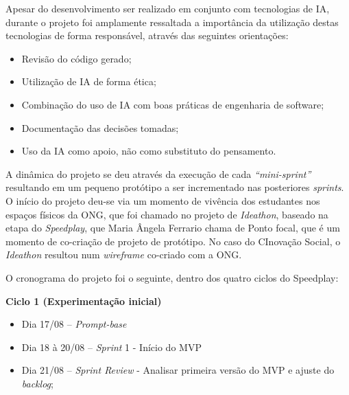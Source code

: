 Apesar do desenvolvimento ser realizado em conjunto com tecnologias de \gls{IA}, durante o projeto foi amplamente ressaltada a importância da utilização destas tecnologias de forma responsável, através das seguintes orientações:
\begin{itemize}
    \item Revisão do código gerado;
    \item Utilização de \gls{IA} de forma ética;
    \item Combinação do uso de \gls{IA} com boas práticas de engenharia de software;
    \item Documentação das decisões tomadas;
    \item Uso da \gls{IA} como apoio, não como substituto do pensamento.
\end{itemize}

A dinâmica do projeto se deu através da execução de cada \textit{“mini-sprint”} resultando em um pequeno protótipo a ser incrementado nas posteriores \textit{sprints}. O início do projeto deu-se via um momento de vivência dos estudantes nos espaços físicos da \gls{ONG}, que foi chamado no projeto de \textit{Ideathon}, baseado na etapa do \textit{Speedplay}, que Maria Ângela Ferrario chama de Ponto focal, que é um momento de co-criação de projeto de protótipo. No caso do CInovação Social, o \textit{Ideathon} resultou num \textit{wireframe} co-criado com a \gls{ONG}.






O cronograma do projeto foi o seguinte, dentro dos quatro ciclos do Speedplay:
\par\vspace{1\baselineskip}

\textbf{Ciclo 1 (Experimentação inicial)}
    \begin{itemize}
        \item Dia 17/08 –\textit{ Prompt-base}
        \item Dia 18 à 20/08 – \textit{Sprint} 1 - Início do \gls{MVP}
        \item Dia 21/08 – \textit{Sprint Review}  - Analisar primeira versão do \gls{MVP} e ajuste do \textit{backlog};
    \end{itemize}
\par\vspace{1\baselineskip}

